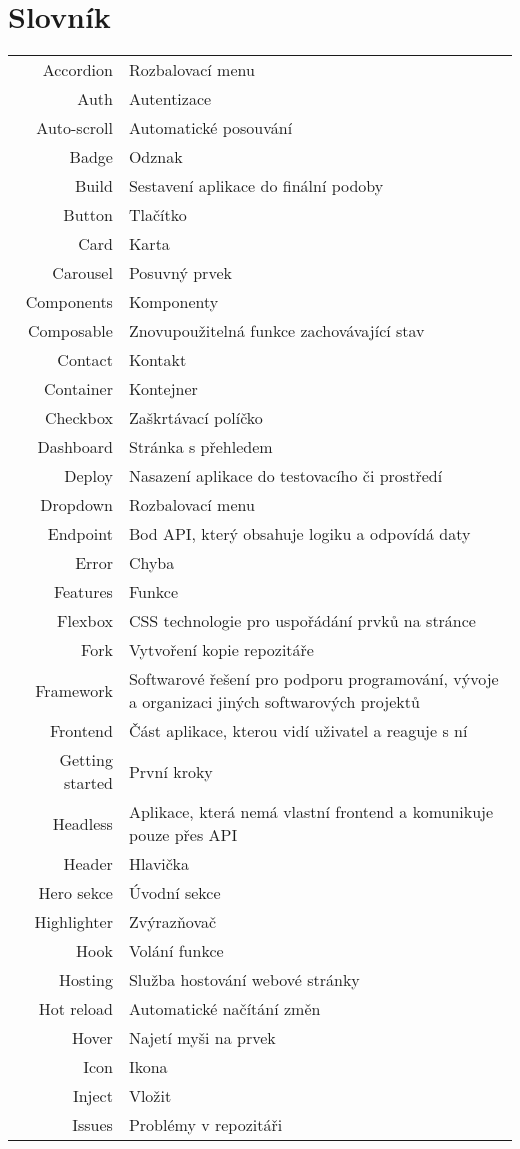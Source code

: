 
\chapter{Slovník}

\begin{tabular}{rp{}}
    Accordion           & Rozbalovací menu \tabularnewline
    Auth                & Autentizace \tabularnewline
    Auto-scroll         & Automatické posouvání \tabularnewline
    Badge               & Odznak \tabularnewline
    Build               & Sestavení aplikace do finální podoby \tabularnewline
    Button              & Tlačítko \tabularnewline
    Card                & Karta \tabularnewline
    Carousel            & Posuvný prvek \tabularnewline
    Components          & Komponenty \tabularnewline
    Composable          & Znovupoužitelná funkce zachovávající stav \tabularnewline
    Contact             & Kontakt \tabularnewline
    Container           & Kontejner \tabularnewline
    Checkbox            & Zaškrtávací políčko \tabularnewline
    Dashboard           & Stránka s přehledem \tabularnewline
    Deploy              & Nasazení aplikace do testovacího či prostředí \tabularnewline
    Dropdown            & Rozbalovací menu \tabularnewline
    Endpoint            & Bod API, který obsahuje logiku a odpovídá daty \tabularnewline
    Error               & Chyba \tabularnewline
    Features            & Funkce \tabularnewline
    Flexbox             & CSS technologie pro uspořádání prvků na stránce \tabularnewline
    Fork                & Vytvoření kopie repozitáře \tabularnewline
    Framework           & Softwarové řešení pro podporu programování, vývoje a organizaci jiných softwarových projektů \tabularnewline
    Frontend            & Část aplikace, kterou vidí uživatel a reaguje s ní \tabularnewline
    Getting started     & První kroky \tabularnewline
    Headless            & Aplikace, která nemá vlastní frontend a komunikuje pouze přes API \tabularnewline
    Header              & Hlavička \tabularnewline
    Hero sekce          & Úvodní sekce \tabularnewline
    Highlighter         & Zvýrazňovač \tabularnewline
    Hook                & Volání funkce \tabularnewline
    Hosting             & Služba hostování webové stránky \tabularnewline
    Hot reload          & Automatické načítání změn \tabularnewline
    Hover               & Najetí myši na prvek \tabularnewline
    Icon                & Ikona \tabularnewline
    Inject              & Vložit \tabularnewline
    Issues              & Problémy v repozitáři \tabularnewline

\end{tabular}
